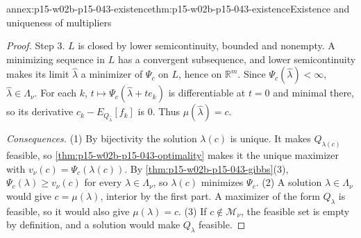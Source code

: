 \begin{annexitem}{annex:p15-w02b-p15-043-existence}{thm:p15-w02b-p15-043-existence}{Existence and uniqueness of multipliers}
\begin{proof}
Step 3. \(L\) is closed by lower semicontinuity, bounded and nonempty. A minimizing
sequence in \(L\) has a convergent subsequence, and lower semicontinuity makes its
limit \(\hat\lambda\) a minimizer of \(\Psi_c\) on \(L\), hence on \(\mathbb R^m\).
Since \(\Psi_c(\hat\lambda)<\infty\), \(\hat\lambda\in\Lambda_\nu\). For each
\(k\), \(t\mapsto\Psi_c(\hat\lambda+te_k)\) is differentiable at \(t=0\) and
minimal there, so its derivative \(c_k-E_{Q_{\hat\lambda}}[f_k]\) is \(0\).
Thus \(\mu(\hat\lambda)=c\).

\emph{Consequences.} (1) By bijectivity the solution \(\lambda(c)\) is unique.
It makes \(Q_{\lambda(c)}\) feasible, so
\cref{thm:p15-w02b-p15-043-optimality} makes it the unique maximizer with
\(v_\nu(c)=\Psi_c(\lambda(c))\). By \cref{thm:p15-w02b-p15-043-gibbs}(3),
\(\Psi_c(\lambda)\geq v_\nu(c)\) for every \(\lambda\in\Lambda_\nu\), so
\(\lambda(c)\) minimizes \(\Psi_c\). (2) A solution \(\lambda\in\Lambda_\nu\)
would give \(c=\mu(\lambda)\), interior by the first part. A maximizer of the form
\(Q_\lambda\) is feasible, so it would also give \(\mu(\lambda)=c\). (3) If
\(c\notin\mathcal M_\nu\), the feasible set is empty by definition, and a solution
would make \(Q_\lambda\) feasible.
\end{proof}
\end{annexitem}

